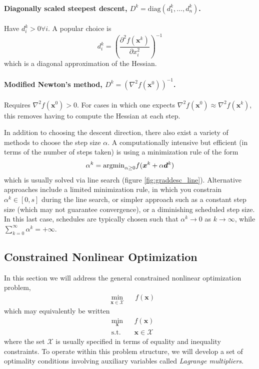 \paragraph{Diagonally scaled steepest descent, $D^k = \textrm{diag}(d_1^k, \ldots, d_n^k)$.} Have $d_i^k >0 \forall i$. A popular choice is 
\begin{equation}
    d_i^k = \left( \frac{\partial^2 f(\bm{x}^k)}{\partial x_i^2} \right)^{-1}
\end{equation}
which is a diagonal approximation of the Hessian. 

\paragraph{Modified Newton's method, $D^k = (\nabla^2 f(\bm{x}^0))^{-1}$.} Requires $\nabla^2 f(\bm{x}^0) > 0$. For cases in which one expects $\nabla^2 f(\bm{x}^0) \approx \nabla^2 f(\bm{x}^k)$, this removes having to compute the Hessian at each step. 

In addition to choosing the descent direction, there also exist a variety of methods to choose the step size $\alpha$. A computationally intensive but efficient (in terms of the number of steps taken) is using a minimization rule of the form 
\begin{equation}
\alpha^k = \text{argmin}_{\alpha\geq 0} f(\bm{x}^k + \alpha \bm{d}^k)  
\end{equation}
which is usually solved via line search (figure \ref{fig:graddesc_line}). Alternative approaches include a limited minimization rule, in which you constrain $\alpha^k \in [0,s]$ during the line search, or simpler approach such as a constant step size (which may not guarantee convergence), or a diminishing scheduled step size. In this last case, schedules are typically chosen such that $\alpha^k \to 0$ as $k \to \infty$, while $\sum_{k=0}^\infty \alpha^k = +\infty$.

\subsection{Constrained Nonlinear Optimization}

In this section we will address the general constrained nonlinear optimization problem,
\begin{equation*}
\begin{aligned}
& \underset{\bm{x} \in \mathcal{X}}{\min}
& & f(\bm{x})
\end{aligned}
\end{equation*}
which may equivalently be written
\begin{equation*}
\begin{aligned}
& \underset{\bm{x}}{\min}
& & f(\bm{x})\\
& \textrm{s.t.} & & \bm{x} \in \mathcal{X}
\end{aligned}
\end{equation*}
where the set $\mathcal{X}$ is usually specified in terms of equality and inequality constraints. To operate within this problem structure, we will develop a set of optimality conditions involving auxiliary variables called \textit{Lagrange multipliers}. 

